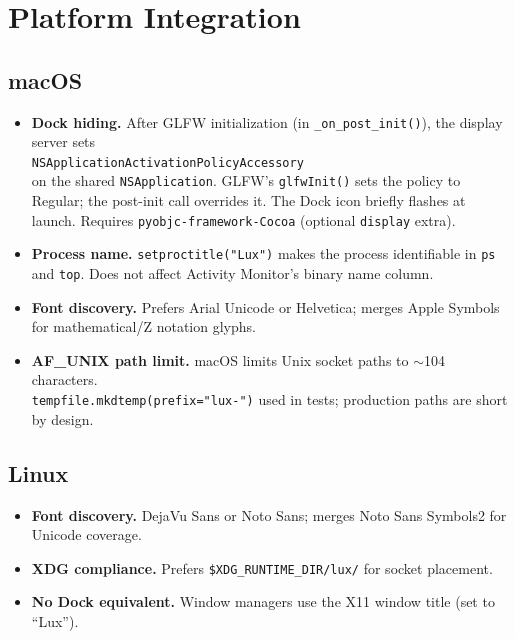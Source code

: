 \documentclass[a4paper,10pt]{article}
\begin{document}
\section{Platform Integration}

\subsection{macOS}

\begin{itemize}
  \item \textbf{Dock hiding.}  After GLFW initialization
    (in \texttt{\_on\_post\_init()}), the display server sets\\
    \texttt{NSApplicationActivationPolicyAccessory}\\
    on the shared \texttt{NSApplication}.  GLFW's
    \texttt{glfwInit()} sets the policy to Regular; the post-init
    call overrides it.  The Dock icon briefly flashes at launch.
    Requires \texttt{pyobjc-framework-Cocoa} (optional
    \texttt{display} extra).
  \item \textbf{Process name.}  \texttt{setproctitle("Lux")} makes
    the process identifiable in \texttt{ps} and \texttt{top}.  Does
    not affect Activity Monitor's binary name column.
  \item \textbf{Font discovery.}  Prefers Arial Unicode or Helvetica;
    merges Apple Symbols for mathematical/Z notation glyphs.
  \item \textbf{AF\_UNIX path limit.}  macOS limits Unix socket
    paths to $\sim$104 characters.\\
    \texttt{tempfile.mkdtemp(prefix="lux-")}
    used in tests; production paths are short by design.
\end{itemize}

\subsection{Linux}

\begin{itemize}
  \item \textbf{Font discovery.}  DejaVu Sans or Noto Sans; merges
    Noto Sans Symbols2 for Unicode coverage.
  \item \textbf{XDG compliance.}  Prefers
    \texttt{\$XDG\_RUNTIME\_DIR/lux/} for socket placement.
  \item \textbf{No Dock equivalent.}  Window managers use the X11
    window title (set to ``Lux'').
\end{itemize}
\end{document}
